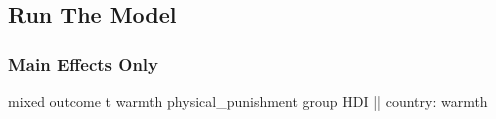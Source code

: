 \documentclass[
  letterpaper,
  DIV=11,
  numbers=noendperiod]{scrreprt}
\newenvironment{Shaded}{\begin{snugshade}}{\end{snugshade}}
\newcommand{\FunctionTok}[1]{\textcolor[rgb]{0.28,0.35,0.67}{#1}}
\newcommand{\NormalTok}[1]{\textcolor[rgb]{0.00,0.23,0.31}{#1}}
\begin{document}
\subsection{Run The Model}\label{run-the-model-3}

\subsubsection{Main Effects Only}\label{main-effects-only}

\begin{Shaded}
\begin{Highlighting}[]

\NormalTok{mixed outcome t warmth physical\_punishment }\FunctionTok{group}\NormalTok{ HDI || country: warmth}
\end{Highlighting}
\end{Shaded}
\end{document}
